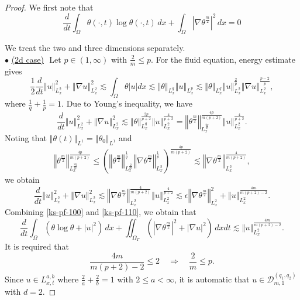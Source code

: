 \documentclass[10pt,a4paper]{amsart}
\newcommand{\abs}[1]{\left| #1 \right|}
\newcommand{\bke}[1]{\left( #1 \right)}
\newcommand{\norm}[1]{\left\Vert #1 \right\Vert}
\begin{document}
\begin{proof}
We first note that 
\begin{equation}\label{ks-pf-100}
\frac{d}{dt}\int_{\Omega} \theta(\cdot, t)\log \theta(\cdot, t) \,dx+\int_{\Omega} \left|\nabla \theta^{\frac{m}{2}}\right|^{2} \,dx= 0
\end{equation}

We treat the two and three dimensions separately.
\\
$\bullet$ \underline{(2d case)}\,\,
Let $p\in (1, \infty)$ with $\frac{2}{m}\le p$.
For the fluid equation, energy estimate gives
\[
\frac{1}{2}\frac{d}{dt}\norm{u}_{L^{2}_{x}}^2+\norm{\nabla u}_{L^{2}_{x}}^2\lesssim \int_{\Omega}\theta \abs{u}dx\lesssim \norm{\theta}_{L^{q}_{x}}\norm{u}_{L^{p}_{x}} \lesssim \norm{\theta}_{L^{q}_{x}}\norm{u}^{\frac{2}{p}}_{L^{2}_{x}} \norm{\nabla u}^{\frac{p-2}{p}}_{L^{2}_{x}},
\]
where $\frac{1}{q}+ \frac{1}{p}=1$.
Due to Young's inequality, we have
\[
\frac{d}{dt}\norm{u}_{L^{2}_{x}}^2+\norm{\nabla u}_{L^{2}_{x}}^2\lesssim \norm{\theta}^{\frac{2p}{p+2}}_{L^{q}_{x}}\norm{u}^{\frac{4}{p+2}}_{L^{2}_{x}} =\norm{\theta^{\frac{m}{2}}}^{\frac{4p}{m(p+2)}}_{L^{\frac{2q}{m}}_{x}}\norm{u}^{\frac{4}{p+2}}_{L^{2}_{x}}.
\]
Noting that $\norm{\theta(t)}_{L^1}=\norm{\theta_0}_{L^1}$ and
\[
\norm{\theta^{\frac{m}{2}}}^{\frac{4p}{m(p+2)}}_{L^{\frac{2q}{m}}_{x}}\le \bke{\norm{\theta^{\frac{m}{2}}}^{\frac{1}{q}}_{L^{\frac{2}{m}}_{x}}\norm{\nabla \theta^{\frac{m}{2}}}^{\frac{1}{p}}_{L^{2}_{x}}}^{\frac{4p}{m(p+2)}}\lesssim\norm{\nabla \theta^{\frac{m}{2}}}^{\frac{4}{m(p+2)}}_{L^{2}_{x}},
\]
we obtain
\begin{equation}\label{ks-pf-110}
\frac{d}{dt}\norm{u}_{L^{2}_{x}}^2+\norm{\nabla u}_{L^{2}_{x}}^2\lesssim \norm{\nabla \theta^{\frac{m}{2}}}^{\frac{4}{m(p+2)}}_{L^{2}_{x}}\norm{u}^{\frac{4}{p+2}}_{L^{2}_{x}}
\lesssim \epsilon\norm{\nabla \theta^{\frac{m}{2}}}^{2}_{L^{2}_{x}}+\norm{u}^{\frac{4m}{m(p+2)-2}}_{L^{2}_{x}}.
\end{equation}
Combining \eqref{ks-pf-100} and \eqref{ks-pf-110}, we obtain that 
\begin{equation*}
\frac{d}{dt}\int_{\Omega} (\theta \log \theta +\abs{u}^2)\,dx+\iint_{\Omega_T} (\left|\nabla \theta^{\frac{m}{2}}\right|^{2} +\abs{\nabla u}^2) \,dxdt\lesssim \norm{u}^{\frac{4m}{m(p+2)-2}}_{L^{2}_{x}}.
\end{equation*}
It is required that 
\[
\frac{4m}{m(p+2)-2}\le 2 \quad \Longrightarrow \quad \frac{2}{m} \le p.
\]
Since $u\in L^{a, b}_{x,t}$ where $\frac{2}{a}+\frac{2}{b}=1$ with $2\le a<\infty$, it is automatic that $u\in\mathcal{D}_{m,1}^{(q_1, q_2)}$ with $d=2$.

\end{proof}
\end{document}
